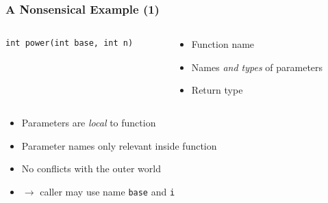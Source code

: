 \begin{frame}[fragile]
  \frametitle{A Nonsensical Example (1)}

  \begin{block}{}
    \begin{columns}[c]
      \begin{column}{.5\textwidth}
        \begin{block}{}
\begin{verbatim}
int power(int base, int n)
\end{verbatim}
        \end{block}
      \end{column}
      \begin{column}{.4\textwidth}
        \begin{itemize}
        \item Function name
        \item Names \textit{and types} of parameters
        \item Return type
        \end{itemize}
      \end{column}
    \end{columns}
  \end{block}

  \begin{itemize}
  \item Parameters are \textit{local} to function
  \item Parameter names only relevant inside function
  \item No conflicts with the outer world
  \item $\to$ caller may use name \texttt{base} and \texttt{i}
  \end{itemize}

\end{frame}


